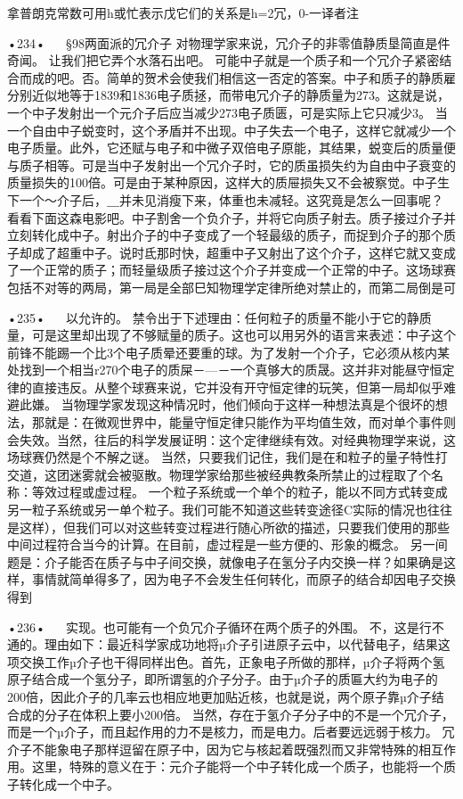 拿普朗克常数可用h或忙表示戊它们的关系是h=2冗，0-一译者注

•234•
  
§98两面派的冗介子
对物理学家来说，冗介子的非零值静质垦简直是件奇闻。
让我们把它弄个水落石出吧。
可能中子就是一个质子和一个冗介子紧密结合而成的吧。否。简单的贺术会使我们相信这一否定的答案。中子和质子的静质雇分别近似地等于1839和1836电子质拯，而带电冗介子的静质量为273。这就是说，一个中子发射出一个元介子后应当减少273电子质匮，可是实际上它只减少3。
当一个自由中子蜕变时，这个矛盾并不出现。中子失去一个电子，这样它就减少一个电子质量。此外，它还赋与电子和中微子双倍电子原能，其结果，蜕变后的质量便与质子相等。可是当中子发射出一个冗介子时，它的质虽损失约为自由中子衰变的质量损失的100倍。可是由于某种原因，这样大的质屉损失又不会被察觉。中子生下一个～介子后，＿并未见消瘦下来，体重也未减轻。这究竟是怎么一回事呢？
看看下面这森电影吧。中子割舍一个负介子，并将它向质子射去。质子接过介子并立刻转化成中子。射出介子的中子变成了一个轻最级的质子，而捉到介子的那个质子却成了超重中子。说时氐那时快，超重中子又射出了这个介子，这样它就又变成了一个正常的质子；而轻量级质子接过这个介子并变成一个正常的中子。这场球赛包括不对等的两局，第一局是全部巳知物理学定律所绝对禁止的，而第二局倒是可

•235•
  
以允许的。
禁令出于下述理由：任何粒子的质量不能小于它的静质量，可是这里却出现了不够赋量的质子。这也可以用另外的语言来表述：中子这个前锋不能踢一个比3个电子质晕还要重的球。为了发射一个介子，它必须从核内某处找到一个相当r270个电子的质屎－—－一个真够大的质晟。这并非对能昼守恒定律的直接违反。从整个球赛来说，它并没有开守恒定律的玩笑，但第一局却似乎难避此嫌。
当物理学家发现这种情况时，他们倾向于这样一种想法真是个很坏的想法，那就是：在微观世界中，能量守恒定律只能作为平均值生效，而对单个事件则会失效。当然，往后的科学发展证明：这个定律继续有效。对经典物理学来说，这场球赛仍然是个不解之谜。
当然，只要我们记住，我们是在和粒子的量子特性打交道，这团迷雾就会被驱散。物理学家给那些被经典教条所禁止的过程取了个名称：等效过程或虚过程。
一个粒子系统或一个单个的粒子，能以不同方式转变成另一粒子系统或另一单个粒子。我们可能不知道这些转变途径C实际的情况也往往是这样），但我们可以对这些转变过程进行随心所欲的描述，只要我们使用的那些中间过程符合当今的计算。在目前，虚过程是一些方便的、形象的概念。
另一间题是：介子能否在质子与中子间交换，就像电子在氢分子内交换一样？如果确是这样，事情就简单得多了，因为电子不会发生任何转化，而原子的结合却因电子交换得到

•236•
  
实现。也可能有一个负冗介子循环在两个质子的外围。
不，这是行不通的。理由如下：最近科学家成功地将µ介子引进原子云中，以代替电子，结果这项交换工作µ介子也干得同样出色。首先，正象电子所做的那样，µ介子将两个氢原子结合成一个氢分子，即所谓氢的介子分子。由于µ介子的质匾大约为电子的200倍，因此介子的几率云也相应地更加贴近核，也就是说，两个原子靠µ介子结合成的分子在体积上要小200倍。
当然，存在于氢介子分子中的不是一个冗介子，而是一个µ介子，而且起作用的力不是核力，而是电力。后者要远远弱于核力。
冗介子不能象电子那样逗留在原子中，因为它与核起着既强烈而又非常特殊的相互作用。这里，特殊的意义在于：元介子能将一个中子转化成一个质子，也能将一个质子转化成一个中子。

